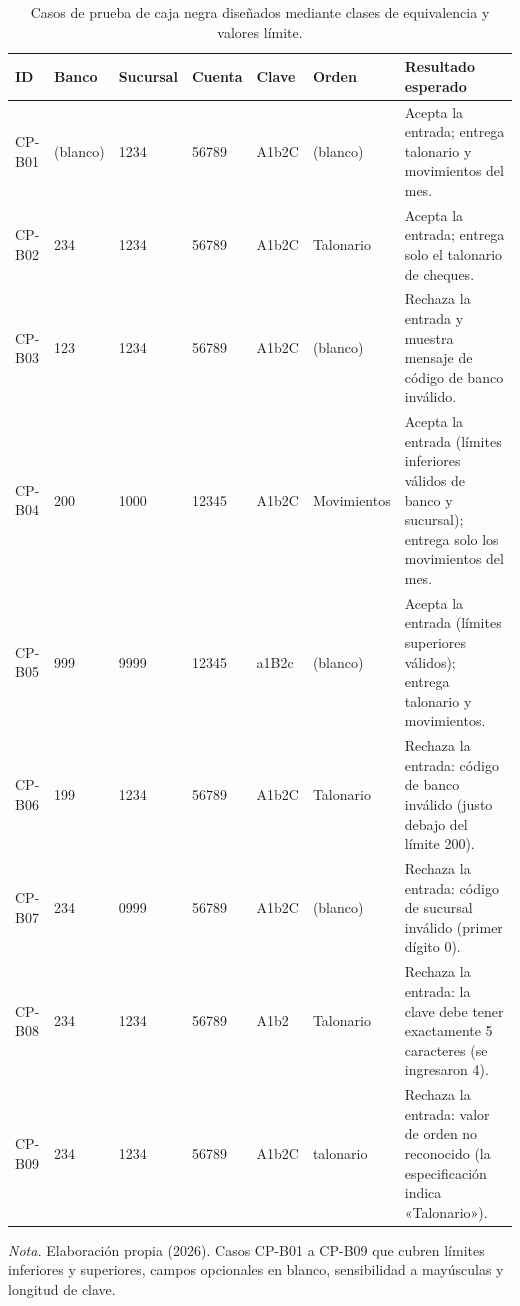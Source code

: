 \begin{table}[H]
  \centering
  \footnotesize
  \setlength{\tabcolsep}{3.5pt}
  \caption{Casos de prueba de caja negra diseñados mediante clases de equivalencia y valores límite.}
  \label{tab:pruebas_casos_bancario}
  \begin{tabularx}{\linewidth}{|C{1.3cm}|C{1.4cm}|C{1.55cm}|C{1.25cm}|C{1.15cm}|C{1.95cm}|Y|}
    \hline
    \textbf{ID} & \textbf{Banco} & \textbf{Sucursal} & \textbf{Cuenta} & \textbf{Clave} & \textbf{Orden} & \textbf{Resultado esperado} \\ \hline
    CP-B01 & (blanco) & 1234 & 56789 & A1b2C & (blanco) & Acepta la entrada; entrega talonario y movimientos del mes. \\ \hline
    CP-B02 & 234 & 1234 & 56789 & A1b2C & Talonario & Acepta la entrada; entrega solo el talonario de cheques. \\ \hline
    CP-B03 & 123 & 1234 & 56789 & A1b2C & (blanco) & Rechaza la entrada y muestra mensaje de código de banco inválido. \\ \hline
    CP-B04 & 200 & 1000 & 12345 & A1b2C & Movimientos & Acepta la entrada (límites inferiores válidos de banco y sucursal); entrega solo los movimientos del mes. \\ \hline
    CP-B05 & 999 & 9999 & 12345 & a1B2c & (blanco) & Acepta la entrada (límites superiores válidos); entrega talonario y movimientos. \\ \hline
    CP-B06 & 199 & 1234 & 56789 & A1b2C & Talonario & Rechaza la entrada: código de banco inválido (justo debajo del límite 200). \\ \hline
    CP-B07 & 234 & 0999 & 56789 & A1b2C & (blanco) & Rechaza la entrada: código de sucursal inválido (primer dígito 0). \\ \hline
    CP-B08 & 234 & 1234 & 56789 & A1b2 & Talonario & Rechaza la entrada: la clave debe tener exactamente 5 caracteres (se ingresaron 4). \\ \hline
    CP-B09 & 234 & 1234 & 56789 & A1b2C & talonario & Rechaza la entrada: valor de orden no reconocido (la especificación indica «Talonario»). \\ \hline
  \end{tabularx}
  \par\vspace{0.2cm}
  {\raggedright \small \emph{Nota.} Elaboración propia (2026). Casos CP-B01 a CP-B09 que cubren límites inferiores y superiores, campos opcionales en blanco, sensibilidad a mayúsculas y longitud de clave.\par}
\end{table}
